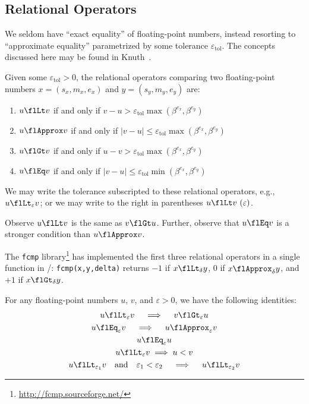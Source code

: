\subsection{Relational Operators}

We seldom have ``exact equality'' of floating-point numbers, instead
resorting to ``approximate equality'' parametrized by some tolerance
$\varepsilon_{\text{tol}}$. The concepts discussed here may be found in Knuth~\cite{taocp2}.

\begin{defn}
  Given some $\varepsilon_{\text{tol}}>0$,
  the relational operators comparing two floating-point numbers
  $x=(s_{x},m_{x},e_{x})$ and $y=(s_{y},m_{y},e_{y})$ are:
  \begin{enumerate}
  \item {} $u\flLt v$ if and only if
    $v-u > \varepsilon_{\text{tol}}\max(\beta^{e_{x}},\beta^{e_{y}})$
  \item {} $u\flApprox v$ if and only if
    $|v-u|\leq\varepsilon_{\text{tol}}\max(\beta^{e_{x}},\beta^{e_{y}})$
  \item {} $u\flGt v$ if and only if
    $u-v > \varepsilon_{\text{tol}}\max(\beta^{e_{x}},\beta^{e_{y}})$
  \item {} $u\flEq v$ if and only if
    $|v-u|\leq\varepsilon_{\text{tol}}\min(\beta^{e_{x}},\beta^{e_{y}})$
  \end{enumerate}
\end{defn}
\begin{notation}
  We may write the tolerance subscripted to these relational operators,
  e.g., $u\flLt_{\varepsilon}v$; or we may write to the right in
  parentheses $u\flLt v~(\varepsilon)$.
\end{notation}
\begin{rmk}
  Observe $u\flLt v$ is the same as $v\flGt u$. Further, observe that
  $u\flEq v$ is a stronger condition than $u\flApprox v$.
\end{rmk}
\begin{rmk}
  The {\tt fcmp} library\footnote{\url{http://fcmp.sourceforge.net/}} has implemented the first three relational
  operators in a single function in \CEE/: \verb|fcmp(x,y,delta)| returns $-1$
  if $x\flLt_{\delta} y$, 0 if $x\flApprox_{\delta} y$, and $+1$ if $x\flGt_{\delta} y$.
\end{rmk}
\begin{thm}
  For any floating-point numbers $u$, $v$, and $\varepsilon>0$, we have
  the following identities:
  \begin{gather}
    u\flLt_{\varepsilon} v\quad\implies\quad v\flGt_{\varepsilon} u\\
    u\flEq_{\varepsilon} v\quad\implies\quad u\flApprox_{\varepsilon}v\\
    u\flEq_{\varepsilon} u\\
    u\flLt_{\varepsilon} v\implies u < v\\
    u\flLt_{\varepsilon_{1}}v\quad\mbox{and}\quad \varepsilon_{1}<\varepsilon_{2}\quad\implies\quad
    u\flLt_{\varepsilon_{2}}v
  \end{gather}
\end{thm}

